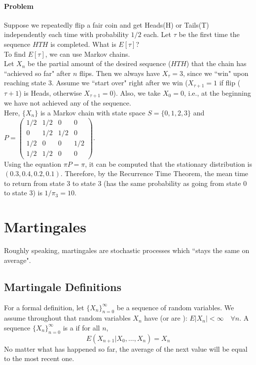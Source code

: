 \documentclass[11pt]{article}
\begin{document}
    \paragraph{Problem}
    Suppose we repeatedly flip a fair coin and get Heads(H) or Tails(T) independently each time with probability $1/2$ each. Let $\tau$ be the first time the sequence $HTH$ is completed. What is $E[\tau]$?\\
    To find $E[\tau]$, we can use Markov chains.\\
    Let $X_n$ be the partial amount of the desired sequence ($HTH$) that the chain has ``achieved so far" after $n$ flips. Then we always have $X_\tau = 3$, since we ``win" upon reaching state 3. Assume we ``start over" right after we win ($X_{\tau + 1} = 1$ if flip ($\tau + 1$) is Heads, otherwise $X_{\tau+1} = 0$). Also, we take $X_0 = 0$, i.e., at the beginning we have not achieved any of the sequence.\\
    Here, $\{X_n\}$ is a Markov chain with state space $S= \{0, 1, 2, 3\}$ and $P = \begin{pmatrix}
    	1/2 & 1/2 & 0 & 0\\
    	0 & 1/2 & 1/2 & 0\\
    	1/2 & 0 & 0 & 1/2\\
    	1/2 & 1/2 & 0 & 0
    \end{pmatrix}$. \\
    Using the equation $\pi P = \pi$, it can be computed that the stationary distribution is $(0.3, 0.4, 0.2, 0.1)$. Therefore, by the Recurrence Time Theorem, the mean time to return from state 3 to state 3 (has the same probability as going from state 0 to state 3) is $1/\pi_3 = 10$.
    
    
    \section{Martingales}
    Roughly speaking, martingales are stochastic processes which ``stays the same on average".
    \subsection{Martingale Definitions}
    For a formal definition, let $\{X_n\}_{n=0}^\infty$ be a sequence of random variables. We assume throughout that random variables $X_n$ have  (or are ): $E|X_n| < \infty \quad \forall n$.
    A sequence $\{X_n\}_{n=0}^\infty$ is a  if for all $n$,
    $$E(X_{n+1}|X_0, \hdots, X_n) = X_n$$
    \remark
    No matter what has happened so far, the average of the next value will be equal to the most recent one. \\
\end{document}
